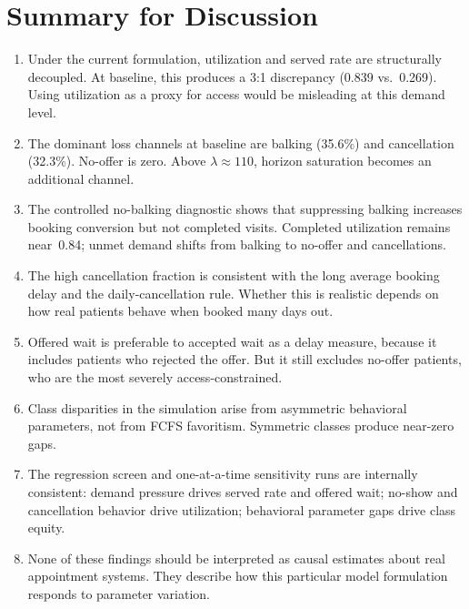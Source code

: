 \documentclass[11pt]{article}
\begin{document}
\section{Summary for Discussion}
\label{sec:summary}

\begin{enumerate}[leftmargin=1.5em, itemsep=4pt]
\item Under the current formulation, utilization and served rate are
structurally decoupled. At baseline, this produces a 3:1 discrepancy
(0.839 vs.\ 0.269). Using utilization as a proxy for access would be
misleading at this demand level.

\item The dominant loss channels at baseline are balking (35.6\%) and
cancellation (32.3\%). No-offer is zero. Above $\lambda \approx 110$,
horizon saturation becomes an additional channel.

\item The controlled no-balking diagnostic shows that suppressing balking
increases booking conversion but not completed visits. Completed utilization
remains near~0.84; unmet demand shifts from balking to no-offer and
cancellations.

\item The high cancellation fraction is consistent with the long average
booking delay and the daily-cancellation rule. Whether this is realistic
depends on how real patients behave when booked many days out.

\item Offered wait is preferable to accepted wait as a delay measure,
because it includes patients who rejected the offer. But it still excludes
no-offer patients, who are the most severely access-constrained.

\item Class disparities in the simulation arise from asymmetric behavioral
parameters, not from FCFS favoritism. Symmetric classes produce
near-zero gaps.

\item The regression screen and one-at-a-time sensitivity runs are
internally consistent: demand pressure drives served rate and offered
wait; no-show and cancellation behavior drive utilization; behavioral
parameter gaps drive class equity.

\item None of these findings should be interpreted as causal estimates
about real appointment systems. They describe how this particular model
formulation responds to parameter variation.
\end{enumerate}
\end{document}
